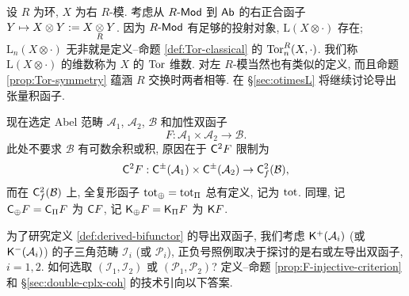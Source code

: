 \begin{example}[$\Tor$ 维数]\label{eg:Tor-dimension}
	设 $R$ 为环, $X$ 为右 $R$-模. 考虑从 $R\text{-}\mathsf{Mod}$ 到 $\mathsf{Ab}$ 的右正合函子 $Y \mapsto X \otimes Y := X \underset{R}{\otimes} Y$. 因为 $R\text{-}\mathsf{Mod}$ 有足够的投射对象, $\mathrm{L}(X \otimes \cdot)$ 存在; $\mathrm{L}_n(X \otimes \cdot)$ 无非就是定义--命题 \ref{def:Tor-classical} 的 $\operatorname{Tor}^R_n(X, \cdot)$. 我们称 $\mathrm{L}(X \otimes \cdot)$ 的维数称为 $X$ 的 $\Tor$ 维数. 对左 $R$-模当然也有类似的定义, 而且命题 \ref{prop:Tor-symmetry} 蕴涵 $R$ 交换时两者相等. 在 \S\ref{sec:otimesL} 将继续讨论导出张量积函子.
\end{example}

现在选定 Abel 范畴 $\mathcal{A}_1$, $\mathcal{A}_2$, $\mathcal{B}$ 和加性双函子
\[ F: \mathcal{A}_1 \times \mathcal{A}_2 \to \mathcal{B}. \]
此处不要求 $\mathcal{B}$ 有可数余积或积, 原因在于 $\mathsf{C}^2 F$ 限制为
\begin{gather*}
	\mathsf{C}^2 F: \mathsf{C}^{\pm}(\mathcal{A}_1) \times \mathsf{C}^{\pm} (\mathcal{A}_2) \to \mathsf{C}^2_f(\mathcal{B}),
\end{gather*}
而在 $\mathsf{C}^2_f(\mathcal{B})$ 上, 全复形函子 $\operatorname{tot}_{\oplus} = \operatorname{tot}_{\Pi}$ 总有定义, 记为 $\operatorname{tot}$. 同理, 记 $\mathsf{C}_{\oplus} F = \mathsf{C}_{\Pi} F$ 为 $\mathsf{C} F$, 记 $\mathsf{K}_{\oplus} F = \mathsf{K}_{\Pi} F$ 为 $\mathsf{K} F$.

为了研究定义 \ref{def:derived-bifunctor} 的导出双函子, 我们考虑 $\mathsf{K}^+(\mathcal{A}_i)$ (或 $\mathsf{K}^-(\mathcal{A}_i)$) 的子三角范畴 $\mathcal{I}_i$ (或 $\mathcal{P}_i$), 正负号照例取决于探讨的是右或左导出双函子, $i = 1, 2$. 如何选取 $(\mathcal{I}_1, \mathcal{I}_2)$ 或 $(\mathcal{P}_1, \mathcal{P}_2)$? 定义--命题 \ref{prop:F-injective-criterion} 和 \S\ref{sec:double-cplx-coh} 的技术引向以下答案.

